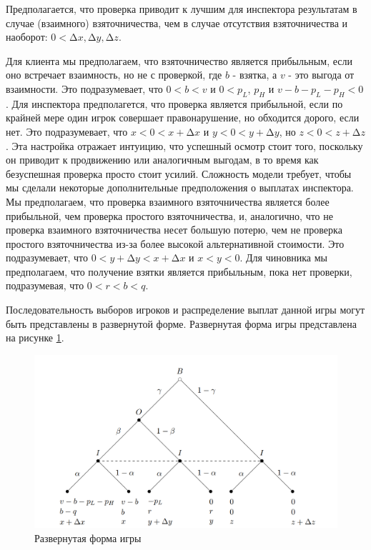 \par
Предполагается, что проверка приводит к лучшим для инспектора результатам в случае (взаимного) взяточничества, чем в случае отсутствия взяточничества и наоборот: $0 <∆x, ∆y, ∆z$.
\par
Для клиента мы предполагаем, что взяточничество является прибыльным, если оно встречает взаимность, но не с проверкой, где $b$ - взятка, а $v$ - это выгода от взаимности. Это подразумевает, что $0 < b < v$ и $0 < p_L$, $p_H$ и $v - b - p_L - p_H <0$.
Для инспектора предполагется, что проверка является прибыльной, если по крайней мере один игрок совершает правонарушение, но обходится дорого, если нет. Это подразумевает, что $x <0 <x + ∆x$ и $y <0 <y + ∆y$, но $z <0 <z + ∆z$. Эта настройка отражает интуицию, что успешный осмотр стоит того, поскольку он приводит к продвижению или аналогичным выгодам, в то время как безуспешная проверка просто стоит усилий. Сложность модели требует, чтобы мы сделали некоторые дополнительные предположения о выплатах инспектора. Мы предполагаем, что проверка взаимного взяточничества является более прибыльной, чем проверка простого взяточничества, и, аналогично, что не проверка взаимного взяточничества несет большую потерю, чем не проверка простого взяточничества из-за более высокой альтернативной стоимости. Это подразумевает, что $0 <y + ∆y <x + ∆x$ и $x < y < 0$. Для чиновника мы предполагаем, что получение взятки является прибыльным, пока нет проверки, подразумевая, что $0 < r < b < q$.
\par
Последовательность выборов игроков и распределение выплат данной игры могут быть представлены в развернутой форме. Развернутая форма игры представлена на рисунке \ref{fig:figef1}.
\begin{figure}[H]
	\centering
	\includegraphics[width=0.9\linewidth]{inc/img/ef1}
	\caption{Развернутая форма игры}
	\label{fig:figef1}
\end{figure}
